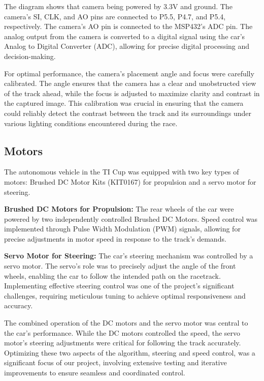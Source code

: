\documentclass[conference]{IEEEtran}
\begin{document}
The diagram shows that camera being powered by 3.3V and ground. The camera's SI, CLK, and AO pins are connected to P5.5, P4.7, and P5.4, respectively. The camera's AO pin is connected to the MSP432's ADC pin. The analog output from the camera is converted to a digital signal using the car's Analog to Digital Converter (ADC), allowing for precise digital processing and decision-making.

For optimal performance, the camera's placement angle and focus were carefully calibrated. The angle ensures that the camera has a clear and unobstructed view of the track ahead, while the focus is adjusted to maximize clarity and contrast in the captured image. This calibration was crucial in ensuring that the camera could reliably detect the contrast between the track and its surroundings under various lighting conditions encountered during the race.

\subsection{Motors}

The autonomous vehicle in the TI Cup was equipped with two key types of motors: Brushed DC Motor Kits (KIT0167) for propulsion and a servo motor for steering.

\textbf{Brushed DC Motors for Propulsion:} The rear wheels of the car were powered by two independently controlled Brushed DC Motors. Speed control was implemented through Pulse Width Modulation (PWM) signals, allowing for precise adjustments in motor speed in response to the track's demands.

\textbf{Servo Motor for Steering:} The car's steering mechanism was controlled by a servo motor. The servo's role was to precisely adjust the angle of the front wheels, enabling the car to follow the intended path on the racetrack. Implementing effective steering control was one of the project's significant challenges, requiring meticulous tuning to achieve optimal responsiveness and accuracy.

The combined operation of the DC motors and the servo motor was central to the car's performance. While the DC motors controlled the speed, the servo motor's steering adjustments were critical for following the track accurately. Optimizing these two aspects of the algorithm, steering and speed control, was a significant focus of our project, involving extensive testing and iterative improvements to ensure seamless and coordinated control.
\end{document}
